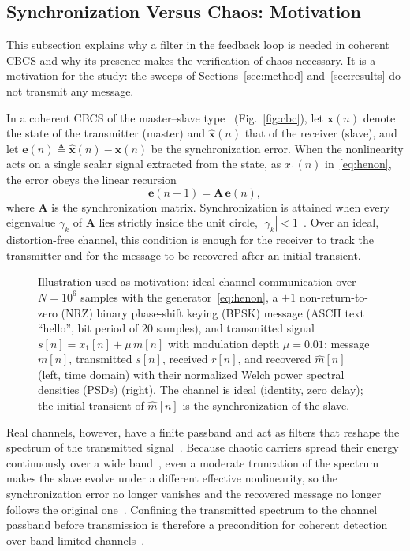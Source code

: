 \documentclass[journal]{IEEEtran}
\begin{document}
\subsection{Synchronization Versus Chaos: Motivation}\label{sub:sync}
This subsection explains why a filter in the feedback loop is needed in
coherent CBCS and why its presence makes the verification of chaos necessary.
It is a motivation for the study: the sweeps of Sections~\ref{sec:method}
and~\ref{sec:results} do not transmit any message.

In a coherent CBCS of the master--slave type~\cite{Pecora1990} (Fig.~\ref{fig:cbc}), let
$\mathbf{x}(n)$ denote the state of the transmitter (master) and
$\hat{\mathbf{x}}(n)$ that of the receiver (slave), and let
$\mathbf{e}(n)\triangleq\hat{\mathbf{x}}(n)-\mathbf{x}(n)$ be the synchronization
error. When the nonlinearity acts on a single scalar signal extracted from
the state, as $x_1(n)$ in~\eqref{eq:henon}, the error obeys the linear
recursion
\begin{equation}
  \mathbf{e}(n+1) = \mathbf{A}\,\mathbf{e}(n),
  \label{eq:syncerror}
\end{equation}
where $\mathbf{A}$ is the synchronization matrix. Synchronization is attained
when every eigenvalue $\gamma_k$ of $\mathbf{A}$ lies strictly inside the unit
circle, $|\gamma_k|<1$~\cite{BorgesTese2026}. Over an ideal,
distortion-free channel, this condition is enough for the receiver to track
the transmitter and for the message to be recovered after an initial
transient.

\begin{figure}[!t]
\centering

\caption{Illustration used as motivation: ideal-channel communication over
$N=10^{6}$ samples with the generator~\eqref{eq:henon}, a $\pm1$
non-return-to-zero (NRZ) binary phase-shift keying (BPSK) message (ASCII text
``hello'', bit period of 20 samples), and transmitted signal
$s[n]=x_1[n]+\mu\,m[n]$ with modulation depth $\mu=0.01$: message $m[n]$,
transmitted $s[n]$, received $r[n]$, and recovered $\hat{m}[n]$ (left, time
domain) with their normalized Welch power spectral densities (PSDs) (right). The channel is
ideal (identity, zero delay); the initial transient of $\hat{m}[n]$ is the
synchronization of the slave.}
\label{fig:comm_ideal}
\end{figure}

Real channels, however, have a finite passband and act as filters that
reshape the spectrum of the transmitted signal~\cite{Eisencraft2011}. Because
chaotic carriers spread their energy continuously over a wide
band~\cite{Baptista2021}, even a moderate truncation of the spectrum makes the
slave evolve under a different effective nonlinearity, so the synchronization
error no longer vanishes and the recovered message no longer follows the
original one~\cite{BorgesTese2026}. Confining the transmitted spectrum to the
channel passband before transmission is therefore a precondition for coherent
detection over band-limited channels~\cite{Eisencraft2009,Fontes2016}.
\end{document}

